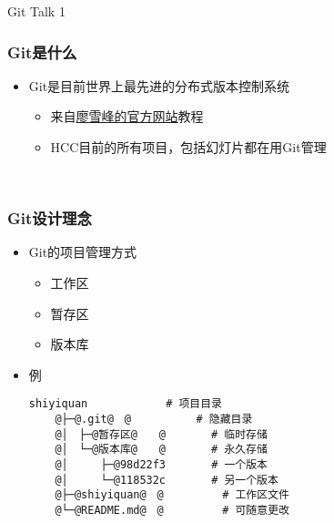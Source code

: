 


\begin{CJK}{UTF8}{gbsn}

\PreFirstFrame
\begin{frame} [fragile]
	\centerline{\fontsize{42}{42}\selectfont Git Talk 1}
\end{frame}
\PostFirstFrame

\begin{frame} [fragile]
	\frametitle{Git是什么}
	\linespread{1.5}
	\begin{itemize}
	\item Git是目前世界上最先进的分布式版本控制系统
		\begin{itemize}
		\item 来自\href{https://www.liaoxuefeng.com/wiki/896043488029600}
						{廖雪峰的官方网站}教程
		\item HCC目前的所有项目，包括幻灯片都在用Git管理
		\end{itemize}
	\end{itemize}
	
	\
	
	\centerline{}
\end{frame}

\begin{frame} [fragile]
	\frametitle{Git设计理念}
	\linespread{1.5}
	\begin{itemize}
	\item Git的项目管理方式
		\begin{itemize}
		\item 工作区
		\item 暂存区
		\item 版本库
		\end{itemize}
	\item 例
	\linespread{0}
	\begin{lstlisting}[style=bashstyle, gobble=4, texcl, escapechar=@]
	shiyiquan			 # 项目目录
	@├─@.git@　@			 # 隐藏目录
	@│　├─@暂存区@　　@		# 临时存储
	@│　└─@版本库@　　@		# 永久存储
	@│　　　├─@98d22f3		  # 一个版本
	@│　　　└─@118532c		  # 另一个版本
	@├─@shiyiquan@　@		 # 工作区文件
	@└─@README.md@　@		 # 可随意更改
	\end{lstlisting}
	\linespread{1.5}
	\end{itemize}
\end{frame}


\end{CJK}
